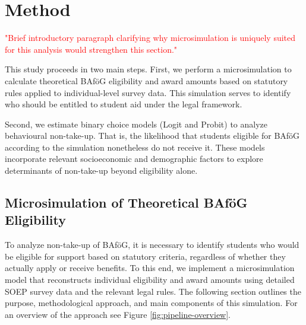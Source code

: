 %
%





\section{Method} 

\textcolor{red}{"Brief introductory paragraph clarifying why microsimulation is uniquely suited for this analysis would strengthen this section."}

This study proceeds in two main steps. 
First, we perform a microsimulation to calculate theoretical BAföG eligibility and award amounts based on statutory rules applied to individual-level survey data. 
This simulation serves to identify who should be entitled to student aid under the legal framework.

Second, we estimate binary choice models (Logit and Probit) to analyze behavioural non-take-up. 
That is, the likelihood that students eligible for BAföG according to the simulation nonetheless do not receive it. 
These models incorporate relevant socioeconomic and demographic factors to explore determinants of non-take-up beyond eligibility alone.

\subsection{Microsimulation of Theoretical BAföG Eligibility} 
To analyze non-take-up of BAföG, it is necessary to identify students who would be eligible for support based on statutory criteria, regardless of whether they actually apply or receive benefits. 
To this end, we implement a microsimulation model that reconstructs individual eligibility and award amounts using detailed SOEP survey data and the relevant legal rules.
The following section outlines the purpose, methodological approach, and main components of this simulation. 
For an overview of the approach see Figure \ref{fig:pipeline-overview}.

